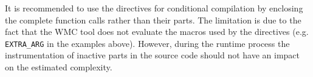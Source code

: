 It is recommended to use the directives for conditional compilation by enclosing the complete function calls rather than their parts. The limitation is due to the fact that the WMC tool does not evaluate the macros used by the directives (e.g. \verb|EXTRA_ARG| in the examples above). However, during the runtime process the instrumentation of inactive parts in the source code should not have an impact on the estimated complexity.
